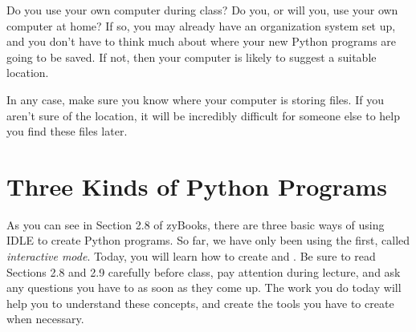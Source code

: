 Do you use your own computer during class?  Do you, or will you, use your own computer at home?  If so, you may already have an organization system set up, and you don't have to think much about where your new Python programs are going to be saved.  If not, then your computer is likely to suggest a suitable location.

In any case, make sure you know where your computer is storing files.  If you aren't sure of the location, it will be incredibly difficult for someone else to help you find these files later.

\section{Three Kinds of Python Programs}

As you can see in Section 2.8 of zyBooks, there are three basic ways of using IDLE to create Python programs.  So far, we have only been using the first, called \textit{interactive mode}.  Today, you will learn how to create  and .  Be sure to read Sections 2.8 and 2.9 carefully before class, pay attention during lecture, and ask any questions you have to as soon as they come up.  The work you do today will help you to understand these concepts, and create the tools you have to create when necessary.